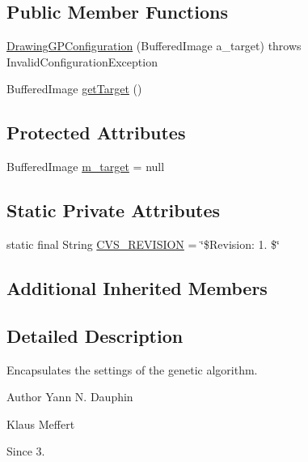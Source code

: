 \subsection*{Public Member Functions}
\begin{DoxyCompactItemize}
\item 
\hyperlink{classexamples_1_1gp_1_1monalisa_1_1core_1_1_drawing_g_p_configuration_a83f8e426e87bbe741eea6ebc04a65be0}{Drawing\-G\-P\-Configuration} (Buffered\-Image a\-\_\-target)  throws Invalid\-Configuration\-Exception 
\item 
Buffered\-Image \hyperlink{classexamples_1_1gp_1_1monalisa_1_1core_1_1_drawing_g_p_configuration_a6c7aae72383ddc65f82eca7faf1ef16d}{get\-Target} ()
\end{DoxyCompactItemize}
\subsection*{Protected Attributes}
\begin{DoxyCompactItemize}
\item 
Buffered\-Image \hyperlink{classexamples_1_1gp_1_1monalisa_1_1core_1_1_drawing_g_p_configuration_a2343e3d99f1ddbc8f899155c6475db96}{m\-\_\-target} = null
\end{DoxyCompactItemize}
\subsection*{Static Private Attributes}
\begin{DoxyCompactItemize}
\item 
static final String \hyperlink{classexamples_1_1gp_1_1monalisa_1_1core_1_1_drawing_g_p_configuration_a9fdd25c44986eff288a7e19c6e20b306}{C\-V\-S\-\_\-\-R\-E\-V\-I\-S\-I\-O\-N} = \char`\"{}\$Revision\-: 1. \$\char`\"{}
\end{DoxyCompactItemize}
\subsection*{Additional Inherited Members}


\subsection{Detailed Description}
Encapsulates the settings of the genetic algorithm.

\begin{DoxyAuthor}{Author}
Yann N. Dauphin 

Klaus Meffert 
\end{DoxyAuthor}
\begin{DoxySince}{Since}
3. 
\end{DoxySince}


